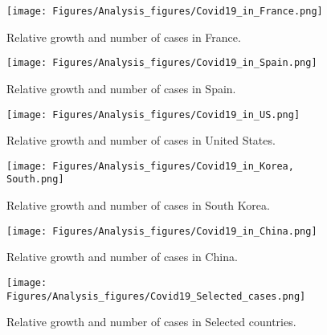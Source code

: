 \begin{figure}
    \centering
    \texttt{[image: Figures/Analysis\_figures/Covid19\_in\_France.png]}
    \caption{Relative growth and number of cases in France.}\label{fig:France}
\end{figure}

\begin{figure}
    \centering
    \texttt{[image: Figures/Analysis\_figures/Covid19\_in\_Spain.png]}
    \caption{Relative growth and number of cases in Spain.}\label{fig:Spain}
\end{figure}

\begin{figure}
    \centering
    \texttt{[image: Figures/Analysis\_figures/Covid19\_in\_US.png]}
    \caption{Relative growth and number of cases in United States.}\label{fig:US}
\end{figure}

\begin{figure}
    \centering
    \texttt{[image: Figures/Analysis\_figures/Covid19\_in\_Korea, South.png]}
    \caption{Relative growth and number of cases in South Korea.}\label{fig:SouthKorea}
\end{figure}

\begin{figure}
    \centering
    \texttt{[image: Figures/Analysis\_figures/Covid19\_in\_China.png]}
    \caption{Relative growth and number of cases in China.}\label{fig:China}
\end{figure}

\begin{figure}
    \centering
    \texttt{[image: Figures/Analysis\_figures/Covid19\_Selected\_cases.png]}
    \caption{Relative growth and number of cases in Selected countries.}\label{fig:Selected}
\end{figure}
